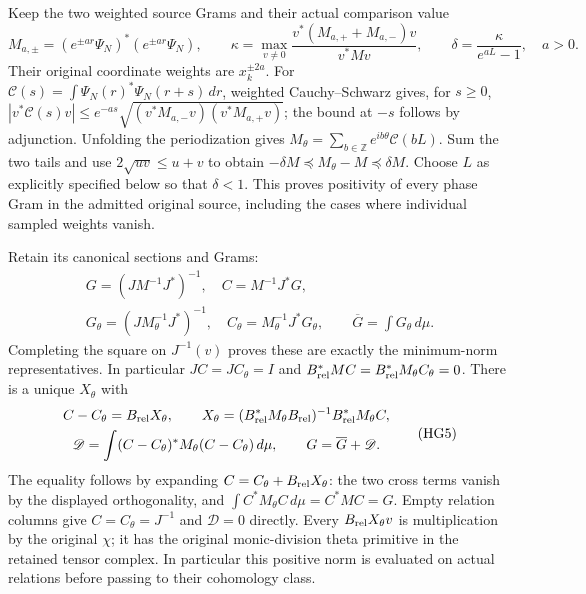 Keep the two weighted source Grams and their actual comparison value
\[
 M_{a,\pm}=(e^{\pm ar}\Psi_N)^*(e^{\pm ar}\Psi_N),\qquad
 \kappa=\max_{v\ne0}\frac{v^*(M_{a,+}+M_{a,-})v}{v^*Mv},\qquad
 \delta=\frac{\kappa}{e^{aL}-1},\quad a>0.
 \tag{HG3}
\]
Their original coordinate weights are $x_k^{\pm2a}$. For
$\mathcal C(s)=\int\Psi_N(r)^*\Psi_N(r+s)\,dr$, weighted
Cauchy--Schwarz gives, for $s\ge0$,
$|v^*\mathcal C(s)v|\le e^{-as}
\sqrt{(v^*M_{a,-}v)(v^*M_{a,+}v)}$; the bound at $-s$ follows by
adjunction. Unfolding the periodization gives
$M_\theta=\sum_{b\in\mathbb Z}e^{ib\theta}\mathcal C(bL)$.
Sum the two tails and use $2\sqrt{uv}\le u+v$ to obtain
$-\delta M\preceq M_\theta-M\preceq\delta M$.
Choose $L$ as explicitly specified below so that $\delta<1$.
This proves positivity of every phase Gram in the admitted original
source, including the cases where individual sampled weights vanish.

Retain its canonical sections and Grams:
\[
\begin{gathered}
 G=(JM^{-1}J^*)^{-1},\quad C=M^{-1}J^*G,\\
 G_\theta=(JM_\theta^{-1}J^*)^{-1},\quad
 C_\theta=M_\theta^{-1}J^*G_\theta,\qquad
 \overline G=\int G_\theta\,d\mu .
\end{gathered}\tag{HG4}
\]
Completing the square on $J^{-1}(v)$ proves these are exactly the
minimum-norm representatives. In particular $JC=JC_\theta=I$ and
$B_{\rm rel}^*MC=B_{\rm rel}^*M_\theta C_\theta=0$.
There is a unique $X_\theta$ with
\[
\begin{gathered}
 C-C_\theta=B_{\rm rel}X_\theta,\qquad
 X_\theta=(B_{\rm rel}^*M_\theta B_{\rm rel})^{-1}
                       B_{\rm rel}^*M_\theta C,\\
 \mathscr D=\int (C-C_\theta)^*M_\theta(C-C_\theta)\,d\mu,
 \qquad G=\overline G+\mathscr D .
\end{gathered}\tag{HG5}
\]
The equality follows by expanding $C=C_\theta+B_{\rm rel}X_\theta$:
the two cross terms vanish by the displayed orthogonality, and
$\int C^*M_\theta C\,d\mu=C^*MC=G$. Empty relation columns give
$C=C_\theta=J^{-1}$ and $\mathscr D=0$ directly.
Every $B_{\rm rel}X_\theta v$ is multiplication by the original $\chi$;
it has the original monic-division theta primitive in the retained
tensor complex. In particular this positive norm is evaluated on actual
relations before passing to their cohomology class.

